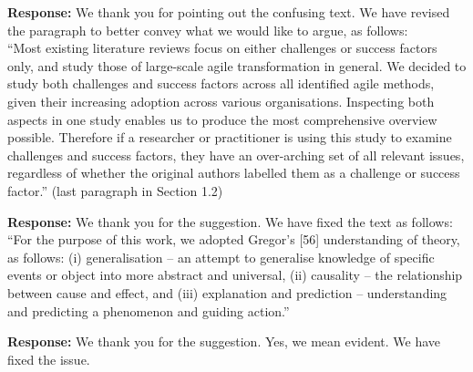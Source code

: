 \documentclass[a4paper,twoside,11pt]{reviewresponse}
\begin{document}
\textbf{Response:}
We thank you for pointing out the confusing text. We have revised the paragraph to better convey what we would like to argue, as follows:\\
``Most existing literature reviews focus on either challenges or success factors only, and study those of large-scale agile transformation in general. We decided to study both challenges and success factors across all identified agile methods, given their increasing adoption across various organisations. Inspecting both aspects in one study enables us to produce the most comprehensive overview possible. Therefore if a researcher or practitioner is using this study to examine challenges and success factors, they have an over-arching set of all relevant issues, regardless of whether the original authors labelled them as a challenge or success factor.'' (last paragraph in Section 1.2)

\textbf{Response:}
We thank you for the suggestion. We have fixed the text as follows:\\
``For the purpose of this work, we adopted Gregor's [56] understanding of theory, as follows: (i) generalisation -- an attempt to generalise knowledge of specific events or object into more abstract and universal, (ii) causality -- the relationship between cause and effect, and (iii) explanation and prediction -- understanding and predicting a phenomenon and guiding action.''

\textbf{Response:}
We thank you for the suggestion. Yes, we mean evident. We have fixed the issue.
\end{document}
